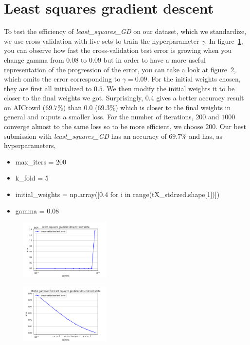 \documentclass[11pt, a4paper, twoside]{article}
\begin{document}
\section{Least squares gradient descent}
To test the efficiency of \textit{least\_squares\_GD} on our dataset, which we standardize, we use cross-validation with five sets to train the hyperparameter $\gamma$.
In figure~\ref{fig:lsgd}, you can observe how fast the cross-validation test error is growing when you change gamma from $0.08$ to $0.09$ but in order to have a more useful representation of the progression of the error, you can take a look at figure~\ref{fig:lsgd_useful}, which omits the error corresponding to $\gamma = 0.09$.
For the initial weights chosen, they are first all initialized to $0.5$. We then modify the initial weights it to be closer to the final weights we got. Surprisingly, $0.4$ gives a better accuracy result on AICrowd ($69.7\%$) than $0.0$ ($69.3\%$) which is closer to the final weights in general and ouputs a smaller loss.
For the number of iterations, $200$ and $1000$ converge almost to the same loss so to be more efficient, we choose $200$.
Our best submission with \textit{least\_squares\_GD} has an accuracy of $69.7\%$ and has, as hyperparameters,
\begin{itemize}
  \item max\_iters = 200
  \item k\_fold = 5
  \item initial\_weights = np.array([0.4 for i in range(tX\_stdrzed.shape[1])])
  \item gamma = 0.08
\end{itemize}

\begin{figure}[h]
  \includegraphics[width=0.4\textwidth]{raw_data_least_squares_GD.png}
  \label{fig:lsgd}
\end{figure}

\begin{figure}[h]
  \includegraphics[width=0.4\textwidth]{raw_data_least_squares_GD_useful.png}
    \label{fig:lsgd_useful}
\end{figure}
\end{document}
